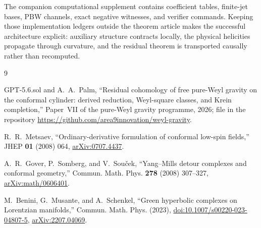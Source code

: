 \documentclass[11pt]{article}
\theoremstyle{definition}
\theoremstyle{remark}
\begin{document}
The companion computational supplement contains coefficient tables,
finite-jet bases, PBW channels, exact negative witnesses, and verifier
commands.  Keeping those implementation ledgers outside the theorem article
makes the successful architecture explicit: auxiliary structure contracts
locally, the physical helicities propagate through curvature, and the
residual theorem is transported causally rather than recomputed.

\begin{thebibliography}{9}

GPT-5.6.sol and A.~A.~Palm,
``Residual cohomology of free pure-Weyl gravity on the conformal cylinder:
derived reduction, Weyl-square classes, and Krein completion,''
Paper~VII of the pure-Weyl gravity programme, 2026;
file  in the
repository \url{https://github.com/area9innovation/weyl-gravity}.

R.~R.~Metsaev,
``Ordinary-derivative formulation of conformal low-spin fields,''
JHEP \textbf{01} (2008) 064,
\href{https://arxiv.org/abs/0707.4437}{arXiv:0707.4437}.

A.~R.~Gover, P.~Somberg, and V.~Sou\v{c}ek,
``Yang--Mills detour complexes and conformal geometry,''
Commun. Math. Phys. \textbf{278} (2008) 307--327,
\href{https://arxiv.org/abs/math/0606401}{arXiv:math/0606401}.

M.~Benini, G.~Musante, and A.~Schenkel,
``Green hyperbolic complexes on Lorentzian manifolds,''
Commun. Math. Phys. (2023),
\href{https://doi.org/10.1007/s00220-023-04807-5}{doi:10.1007/s00220-023-04807-5},
\href{https://arxiv.org/abs/2207.04069}{arXiv:2207.04069}.

\end{thebibliography}
\end{document}
